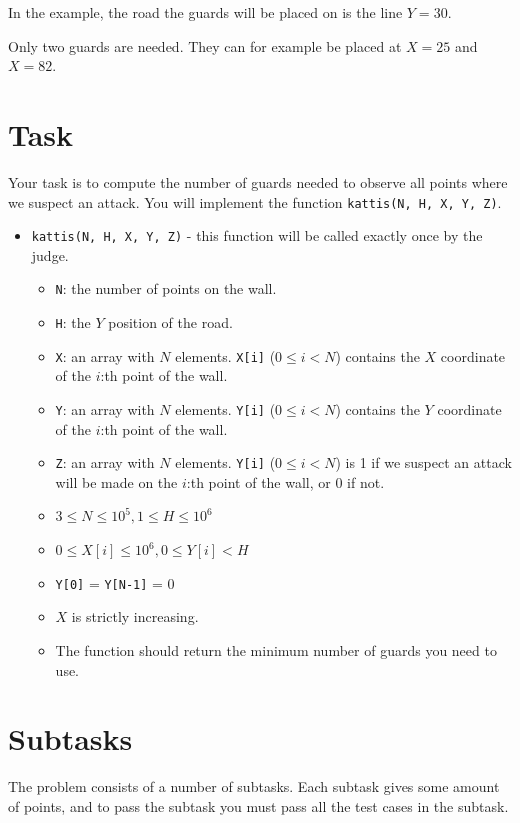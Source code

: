 In the example, the road the guards will be placed on is the line $Y = 30$.

Only two guards are needed. They can for example be placed at $X = 25$ and $X = 82$.

\section*{Task}
Your task is to compute the number of guards needed to observe all points where we suspect an attack. You will implement the function
\texttt{kattis(N, H, X, Y, Z)}.

\begin{itemize}
  \item \texttt{kattis(N, H, X, Y, Z)} - this function will be called exactly once by the judge.
  \begin{itemize}
    \item \texttt{N}: the number of points on the wall.
    \item \texttt{H}: the $Y$ position of the road.
    \item \texttt{X}: an array with $N$ elements. \texttt{X[i]} ($0 \le i < N$) contains the $X$ coordinate of the $i$:th point of the wall.
    \item \texttt{Y}: an array with $N$ elements. \texttt{Y[i]} ($0 \le i < N$) contains the $Y$ coordinate of the $i$:th point of the wall.
    \item \texttt{Z}: an array with $N$ elements. \texttt{Y[i]} ($0 \le i < N$) is 1 if we suspect an attack will be made on the $i$:th point of the wall, or 0 if not.
    \item $3 \le N \le 10^5, 1 \le H \le 10^6$
    \item $0 \le X[i] \le 10^6, 0 \le Y[i] < H$
    \item \texttt{Y[0]} = \texttt{Y[N-1]} = 0
    \item $X$ is strictly increasing.
    \item The function should return the minimum number of guards you need to use.
  \end{itemize}
\end{itemize}

\section*{Subtasks}
The problem consists of a number of subtasks. Each subtask gives some amount of points, and to pass
the subtask you must pass all the test cases in the subtask.

